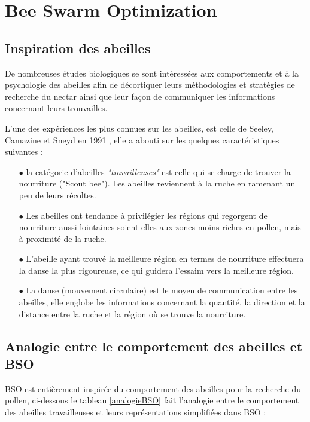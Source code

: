 \section{Bee Swarm Optimization \cite{Drias}}

\subsection{Inspiration des abeilles}
De nombreuses études biologiques se sont intéressées aux comportements et à la psychologie des abeilles afin de décortiquer leurs méthodologies et stratégies de recherche du nectar ainsi que leur façon de communiquer les informations concernant leurs trouvailles.

L'une des expériences les plus connues sur les abeilles, est celle de Seeley, Camazine et Sneyd en 1991 \cite{Seeley}, elle a abouti sur les quelques caractéristiques suivantes :
\\

\begin{itemize}
	
	\item[$\bullet$] la catégorie d'abeilles \textit{"travailleuses"} est celle qui se charge de trouver la nourriture ("Scout bee"). Les abeilles reviennent à la ruche en ramenant un peu de leurs récoltes.
	
	\item[$\bullet$]Les abeilles ont tendance à privilégier les régions qui regorgent de nourriture aussi lointaines soient elles aux zones moins riches en pollen, mais à proximité de la ruche.
	
	\item[$\bullet$] L'abeille ayant trouvé la meilleure région en termes de nourriture effectuera la danse la plus rigoureuse, ce qui guidera l'essaim vers la meilleure région.
	
	\item[$\bullet$] La danse (mouvement circulaire) est le moyen de communication entre les abeilles, elle englobe les informations concernant la quantité, la direction et la distance entre la ruche et la région où se trouve la nourriture.
\end{itemize}

\subsection{Analogie entre le comportement des abeilles et BSO}
BSO est entièrement inspirée du comportement des abeilles pour la recherche du pollen, ci-dessous le tableau \ref{analogieBSO} fait l'analogie entre le comportement des abeilles travailleuses et leurs représentations simplifiées dans BSO :\\

